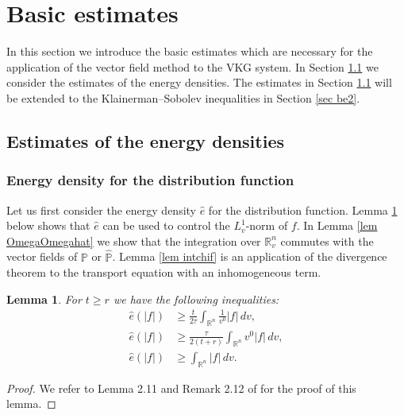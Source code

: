 \documentclass{article}
\newtheorem{lemma}{Lemma}[section]
\newcommand{\bbr}{{\mathbb R}}
\newcommand{\bbp}{{\mathbb P}}
\newcommand{\bbrn}{{\bbr^n}}
\begin{document}

%
\section{Basic estimates} \label{sec be}
In this section we introduce the basic estimates which are necessary for the application of the vector field method to the VKG system. In Section \ref{sec be1} we consider the estimates of the energy densities. The estimates in Section \ref{sec be1} will be extended to the Klainerman--Sobolev inequalities in Section \ref{sec be2}.

%
\subsection{Estimates of the energy densities} \label{sec be1}

%
\subsubsection{Energy density for the distribution function} \label{sec basicf}
Let us first consider the energy density $ \hat{ e } $ for the distribution function. Lemma \ref{lem chiintf} below shows that $ \hat{ e } $ can be used to control the $ L^1_v $-norm of $ f $. In Lemma \ref{lem OmegaOmegahat} we show that the integration over $ \bbr^n_v $ commutes with the vector fields of $ \bbp $ or $ \hat{ \bbp } $. Lemma \ref{lem intchif} is an application of the divergence theorem to the transport equation with an inhomogeneous term.

%
\begin{lemma} \label{lem chiintf}
For $ t \geq r $ we have the following inequalities:
\begin{align*}
\hat{ e } ( | f | ) & \geq \frac{ t }{ 2 \tau } \int_\bbrn \frac{ 1 }{ v^0 } | f | \, d v , \\
\hat{ e } ( | f | ) & \geq \frac{ \tau }{ 2 ( t + r ) } \int_\bbrn v^0 | f | \, d v , \\
\hat{ e } ( | f | ) & \geq \int_\bbrn | f | \, d v .
\end{align*}
\end{lemma}
\begin{proof}
We refer to Lemma 2.11 and Remark 2.12 of \cite{FJS17} for the proof of this lemma.
\end{proof}
\end{document}
